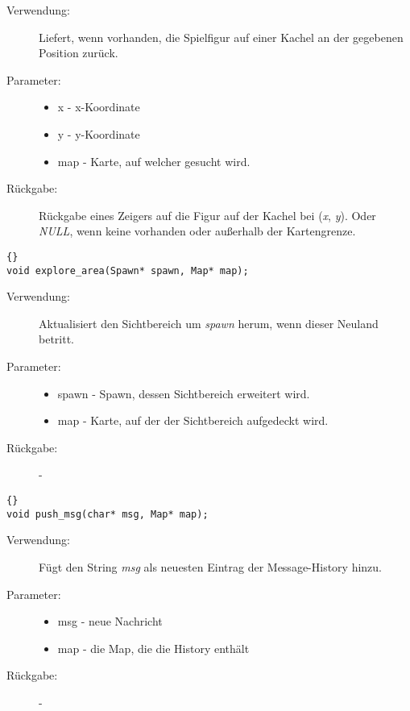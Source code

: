 \documentclass[11pt,a4paper,notitlepage]{report}
\begin{document}
	\begin{description}
		\item[Verwendung:] Liefert, wenn vorhanden, die Spielfigur auf einer Kachel an der gegebenen Position zurück.
		\item[Parameter:] \hfill
		\begin{itemize}
			\item x - x-Koordinate
			\item y - y-Koordinate
			\item map - Karte, auf welcher gesucht wird.
		\end{itemize}
		\item[Rückgabe:] Rückgabe eines Zeigers auf die Figur auf der Kachel bei (\textit{x}, \textit{y}). Oder \textit{NULL}, wenn keine vorhanden oder außerhalb der Kartengrenze.
	\end{description}
	
		\begin{lstlisting}[caption=explore\_area]{}
void explore_area(Spawn* spawn, Map* map);
		\end{lstlisting}
		
	\begin{description}
		\item[Verwendung:] Aktualisiert den Sichtbereich um \textit{spawn} herum, wenn dieser Neuland betritt.
		\item[Parameter:] \hfill
		\begin{itemize}
			\item spawn - Spawn, dessen Sichtbereich erweitert wird.
			\item map - Karte, auf der der Sichtbereich aufgedeckt wird.
		\end{itemize}
		\item[Rückgabe:] -
	\end{description}
	
	  \begin{lstlisting}[caption=push\_msg]{}
void push_msg(char* msg, Map* map);
		\end{lstlisting}
		
	\begin{description}
		\item[Verwendung:] Fügt den String \textit{msg} als neuesten Eintrag der Message-History hinzu.
		\item[Parameter:] \hfill
		\begin{itemize}
			\item msg - neue Nachricht
			\item map - die Map, die die History enthält
		\end{itemize}
		\item[Rückgabe:] -
	\end{description}
\end{document}
